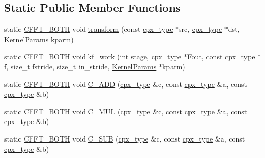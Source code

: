 \subsection*{Static Public Member Functions}
\begin{DoxyCompactItemize}
\item 
static \hyperlink{cudafft_8h_ac4c6e1a008a73d82e1c532fd74830837}{C\+F\+F\+T\+\_\+\+B\+O\+TH} void \hyperlink{classcudafft_ab5c2f4f3e7ea3133a96f8eabc8d9c94f}{transform} (const \hyperlink{classcudafft_a6b6e4901630f197baf4cf7f165543ece}{cpx\+\_\+type} $\ast$src, \hyperlink{classcudafft_a6b6e4901630f197baf4cf7f165543ece}{cpx\+\_\+type} $\ast$dst, \hyperlink{structcudafft_1_1_kernel_params}{Kernel\+Params} kparm)
\item 
static \hyperlink{cudafft_8h_ac4c6e1a008a73d82e1c532fd74830837}{C\+F\+F\+T\+\_\+\+B\+O\+TH} void \hyperlink{classcudafft_af9502e8f518c37489d730fc1830998d2}{kf\+\_\+work} (int stage, \hyperlink{classcudafft_a6b6e4901630f197baf4cf7f165543ece}{cpx\+\_\+type} $\ast$Fout, const \hyperlink{classcudafft_a6b6e4901630f197baf4cf7f165543ece}{cpx\+\_\+type} $\ast$f, size\+\_\+t fstride, size\+\_\+t in\+\_\+stride, \hyperlink{structcudafft_1_1_kernel_params}{Kernel\+Params} $\ast$kparm)
\item 
static \hyperlink{cudafft_8h_ac4c6e1a008a73d82e1c532fd74830837}{C\+F\+F\+T\+\_\+\+B\+O\+TH} void \hyperlink{classcudafft_a014fac9955f6dc417ae80544132f98e4}{C\+\_\+\+A\+DD} (\hyperlink{classcudafft_a6b6e4901630f197baf4cf7f165543ece}{cpx\+\_\+type} \&c, const \hyperlink{classcudafft_a6b6e4901630f197baf4cf7f165543ece}{cpx\+\_\+type} \&a, const \hyperlink{classcudafft_a6b6e4901630f197baf4cf7f165543ece}{cpx\+\_\+type} \&b)
\item 
static \hyperlink{cudafft_8h_ac4c6e1a008a73d82e1c532fd74830837}{C\+F\+F\+T\+\_\+\+B\+O\+TH} void \hyperlink{classcudafft_ac7462d0245377968239aabcc6e942a76}{C\+\_\+\+M\+UL} (\hyperlink{classcudafft_a6b6e4901630f197baf4cf7f165543ece}{cpx\+\_\+type} \&c, const \hyperlink{classcudafft_a6b6e4901630f197baf4cf7f165543ece}{cpx\+\_\+type} \&a, const \hyperlink{classcudafft_a6b6e4901630f197baf4cf7f165543ece}{cpx\+\_\+type} \&b)
\item 
static \hyperlink{cudafft_8h_ac4c6e1a008a73d82e1c532fd74830837}{C\+F\+F\+T\+\_\+\+B\+O\+TH} void \hyperlink{classcudafft_a62e0deba21ac6217451ce410b0029812}{C\+\_\+\+S\+UB} (\hyperlink{classcudafft_a6b6e4901630f197baf4cf7f165543ece}{cpx\+\_\+type} \&c, const \hyperlink{classcudafft_a6b6e4901630f197baf4cf7f165543ece}{cpx\+\_\+type} \&a, const \hyperlink{classcudafft_a6b6e4901630f197baf4cf7f165543ece}{cpx\+\_\+type} \&b)

\end{DoxyCompactItemize}
